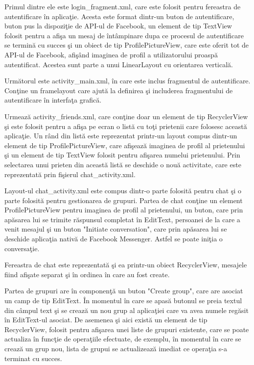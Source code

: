 	Primul dintre ele este login_fragment.xml, care este folosit pentru fereastra de autentificare \^{i}n aplica\c{t}ie. Acesta este format dintr-un buton de autentificare, buton pus la dispozi\c{t}ie de API-ul de Facebook, un element de tip TextView folosit pentru a afi\c{s}a un mesaj de \^{i}nt\^{a}mpinare dupa ce procesul de autentificare se termin\u{a} cu succes \c{s}i un obiect de tip ProfilePictureView, care este oferit tot de API-ul de Facebook, afi\c{s}\^{a}nd imaginea de profil a utilizatorului proasp\u{a} autentificat. Acestea sunt parte a unui LinearLayout cu orientarea vertical\u{a}.

	Urm\u{a}torul este activity_main.xml, \^{i}n care este inclus fragmentul de autentificare. Con\c{t}ine un framelayout care ajut\u{a} la definirea \c{s}i includerea fragmentului de autentificare \^{i}n interfa\c{t}a grafic\u{a}.
	
	Urmeaz\u{a} activity_friends.xml, care con\c{t}ine doar un element de tip RecyclerView \c{s}i este folosit pentru a afi\c{s}a pe ecran o list\u{a} cu to\c{t}i prietenii care folosesc aceast\u{a} aplica\c{t}ie. Un r\^{a}nd din list\u{a} este reprezentat printr-un layout compus dintr-un element de tip ProfilePictureView, care afi\c{s}eaz\u{a} imaginea de profil al prietenului \c{s}i un element de tip TextView folosit pentru afi\c{s}area numelui prietenului. Prin selectarea unui prieten din aceast\u{a} list\u{a} se deschide o nou\u{a} activitate, care este reprezentat\u{a} prin fi\c{s}ierul chat_activity.xml. 
	
	Layout-ul chat_activity.xml este compus dintr-o parte folosit\u{a} pentru chat \c{s}i o parte folosit\u{a} pentru gestionarea de grupuri. Partea de chat con\c{t}ine un element ProfilePictureView pentru imaginea de profil al prietenului, un buton, care prin ap\u{a}sarea lui se trimite r\u{a}spunsul completat \^{i}n EditText, persoanei de la care a venit mesajul \c{s}i un buton "Initiate conversation", care prin ap\u{a}sarea lui se deschide aplica\c{t}ia nativ\u{a} de Facebook Messenger. Astfel se poate ini\c{t}ia o conversa\c{t}ie.

Fereastra de chat este reprezentat\u{a} \c{s}i ea printr-un obiect RecyclerView, mesajele fiind afi\c{s}ate separat \c{s}i \^{i}n ordinea \^{i}n care au fost create.

\newpage
	Partea de grupuri are \^{i}n componen\c{t}\u{a} un buton "Create group", care are asociat un camp de tip EditText. \^{I}n momentul \^{i}n care se apas\u{a} butonul se preia textul din c\^{a}mpul text \c{s}i se creaz\u{a} un nou grup al aplica\c{t}iei care va avea numele reg\u{a}sit \^{i}n EditText-ul asociat. De asemenea \c{s}i aici exist\u{a} un element de tip RecyclerView, folosit pentru afi\c{s}area unei liste de grupuri existente, care se poate actualiza \^{i}n func\c{t}ie de opera\c{t}iile efectuate, de exemplu, \^{i}n momentul \^{i}n care se creaz\u{a} un grup nou, lista de grupui se actualizeaz\u{a} imediat ce opera\c{t}ia s-a terminat cu succes. 
	
